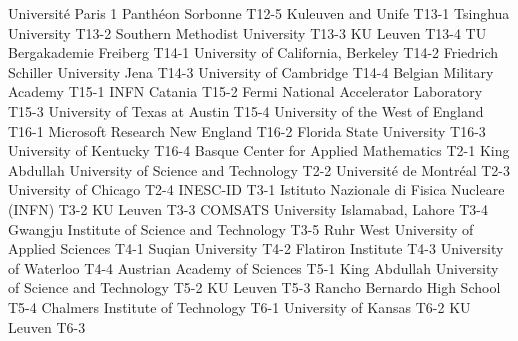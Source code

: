 \begin{multicols}{2}
{Université Paris 1 Panthéon Sorbonne}
{T12-5}
{}
{Kuleuven and Unife}
{T13-1}
{}
{Tsinghua University}
{T13-2}
{}
{Southern Methodist University}
{T13-3}
{}
{KU Leuven}
{T13-4}
{}
{TU Bergakademie Freiberg}
{T14-1}
{}
{University of California, Berkeley}
{T14-2}
{}
{Friedrich Schiller University Jena}
{T14-3}
{}
{University of Cambridge}
{T14-4}
{}
{Belgian Military Academy}
{T15-1}
{}
{INFN Catania}
{T15-2}
{}
{Fermi National Accelerator Laboratory}
{T15-3}
{}
{University of Texas at Austin}
{T15-4}
{}
{University of the West of England}
{T16-1}
{}
{Microsoft Research New England}
{T16-2}
{}
{Florida State University}
{T16-3}
{}
{University of Kentucky}
{T16-4}
{}
{Basque Center for Applied Mathematics}
{T2-1}
{}
{King Abdullah University of Science and Technology}
{T2-2}
{}
{Université de Montréal}
{T2-3}
{}
{University of Chicago}
{T2-4}
{}
{INESC-ID}
{T3-1}
{}
{Istituto Nazionale di Fisica Nucleare (INFN)}
{T3-2}
{}
{KU Leuven}
{T3-3}
{}
{COMSATS University Islamabad, Lahore}
{T3-4}
{}
{Gwangju Institute of Science and Technology}
{T3-5}
{}
{Ruhr West University of Applied Sciences}
{T4-1}
{}
{Suqian University}
{T4-2}
{}
{Flatiron Institute}
{T4-3}
{}
{University of Waterloo}
{T4-4}
{}
{Austrian Academy of Sciences}
{T5-1}
{}
{King Abdullah University of Science and Technology}
{T5-2}
{}
{KU Leuven}
{T5-3}
{}
{Rancho Bernardo High School}
{T5-4}
{}
{Chalmers Institute of Technology}
{T6-1}
{}
{University of Kansas}
{T6-2}
{}
{KU Leuven}
{T6-3}
{}

\end{multicols}
